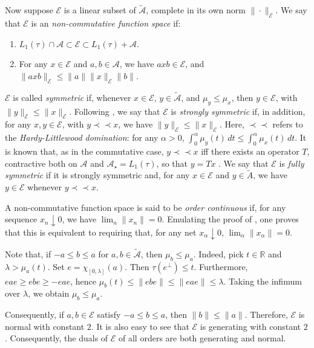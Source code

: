 \documentclass[12pt]{amsart}
\theoremstyle{plain}
\theoremstyle{definition}
\renewcommand{\leq}{\leqslant}
\renewcommand{\geq}{\geqslant}\usepackage{amssymb}
\newcommand{\R}{\mathbb R}
\newcommand{\ce}{\mathcal E}
\newcommand{\A}{\mathcal{A}}
\newcommand{\pprec}{\prec \!\! \prec}
\begin{document}
Now suppose $\ce$ is a linear subset of $\tilde{\A}$, complete in its
own norm $\| \cdot \|_{\ce}$. We say that $\ce$ is an \emph{non-commutative
function space} if:
\begin{enumerate}
\item
$L_1(\tau) \cap \A \subset \ce \subset L_1(\tau) + \A$.
\item
For any $x \in \ce$ and $a, b \in \A$, we have $axb \in \ce$,
and $\|a x b\|_\ce \leq \|a\| \|x\|_\ce \|b\|$.
\end{enumerate}
$\ce$ is called \emph{symmetric} if, whenever $x \in \ce$,
$y \in \tilde{\A}$, and $\mu_y \leq \mu_x$, then $y \in \ce$, with
$\|y\|_\ce \leq \|x\|_\ce$.
Following \cite{DdP12}, we say that $\ce$ is \emph{strongly symmetric}
if, in addition, for any $x, y \in \ce$, with $y \pprec x$, we have
$\|y\|_\ce \leq \|x\|_\ce$. Here, $\pprec$ refers
to the \emph{Hardy-Littlewood domination}: for any $\alpha > 0$,
$\int_0^\alpha \mu_y(t) \, dt \leq \int_0^\alpha \mu_x(t) \, dt$.
It is known that, as in the commutative case, $y \pprec x$ iff there exists an
operator $T$, contractive both on $\A$ and $\A_\star = L_1(\tau)$,
so that $y = Tx$ \cite{DDdP92}. We say that $\ce$
is \emph{fully symmetric} if it is strongly symmetric and, for any
$x \in \ce$ and $y \in \tilde{A}$, we have $y \in \ce$ whenever
$y \pprec x$.

A non-commutative function space is said to be {\emph{order continuous}}
if, for any sequence $x_n \downarrow 0$, we have $\lim_n \|x_n\| = 0$.
Emulating the proof of \cite[Proposition 1.a.8]{LT2}, one proves that this
is equivalent to requiring that, for any net $x_\alpha \downarrow 0$,
$\lim_\alpha \|x_\alpha\| = 0$.

Note that, if  $-a \le b \le a$ for $a,b \in \tilde{\A}$, then $\mu_b \leq \mu_a$.
Indeed,  pick $t \in \R$ and $\lambda > \mu_a(t)$. Set $e = \chi_{[0,\lambda]}(a)$.
Then $\tau(e^\perp) \leq t$. Furthermore, $eae \geq ebe \geq -eae$, hence
$\mu_b(t) \leq \|ebe \| \leq \|eae\| \leq \lambda$. Taking the infimum over $\lambda$,
we obtain $\mu_b \leq \mu_a$.

Consequently, if $a,b \in \ce$ satisfy $-a \leq b \leq a$, then $\|b\| \le \|a\|$.
Therefore, $\ce$ is normal with constant $2$. It is also easy to see that $\ce$ is
generating with constant $2$. Consequently, the duals of $\ce$ of all orders
are both generating and normal.
\end{document}
